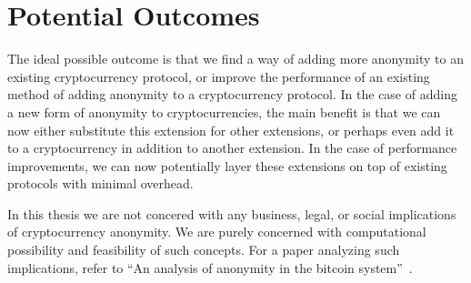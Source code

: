\documentclass[11pt]{artikel3}
\begin{document}
\section{Potential Outcomes}
The ideal possible outcome is that we find a way of adding more anonymity to an
existing cryptocurrency protocol, or improve the performance of an existing
method of adding anonymity to a cryptocurrency protocol. In the case of adding
a new form of anonymity to cryptocurrencies, the main
benefit is that we can now either substitute this extension for other
extensions, or perhaps even add it to a cryptocurrency in addition to another
extension. In the case of performance improvements, we can now potentially layer these
extensions on top of existing protocols with minimal overhead.

In this thesis we are not concered with any business, legal, or social
implications of cryptocurrency anonymity. We are purely concerned with
computational possibility and feasibility of such concepts. For a paper
analyzing such implications, refer to ``An analysis of anonymity in the bitcoin
system''~\cite{Reid11}.



\end{document}

